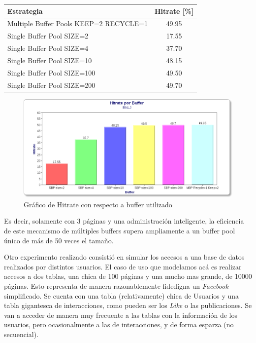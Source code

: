 \begin{table}[H]\centering
    \begin{tabular}{l || c}
    \large{\textbf{Estrategia}}                             & \large{\textbf{Hitrate}} [\%] \\
    \hline
    Multiple Buffer Pools KEEP=2 RECYCLE=1 & 49.95       \\
    Single Buffer Pool SIZE=2              & 17.55       \\
    Single Buffer Pool SIZE=4              & 37.70       \\
    Single Buffer Pool SIZE=10             & 48.15       \\
    Single Buffer Pool SIZE=100            & 49.50       \\
    Single Buffer Pool SIZE=200            & 49.70       \\
    \end{tabular}
\end{table}

\begin{figure}[H]\centering
    \includegraphics[scale=0.4]{BNLJ.png}
    \caption{Gráfico de Hitrate con respecto a buffer utilizado}
    \label{grafiquito}
\end{figure}


Es decir, solamente con 3 p\'aginas y una administraci\'on inteligente, la eficiencia
de este mecanismo de m\'ultiples buffers supera ampliamente a un buffer pool \'unico de
m\'as de 50 veces el tama\~no.

Otro experimento realizado consistió en simular los accesos a una base de datos realizados
por distintos usuarios. El caso de uso que modelamos ac\'a es realizar accesos a dos tablas,
una chica de 100 p\'aginas y una mucho mas grande, de 10000 p\'aginas. Esto representa de manera
razonablemente fidedigna un \textit{Facebook} simplificado. Se cuenta con una tabla (relativamente) chica de Usuarios y 
una tabla gigantesca de interacciones, como pueden ser los \textit{Like} o las publicaciones. 
Se van a acceder de manera muy frecuente a las tablas con la informaci\'on de los usuarios, pero
ocasionalmente a las de interacciones, y de forma esparza (no secuencial).

